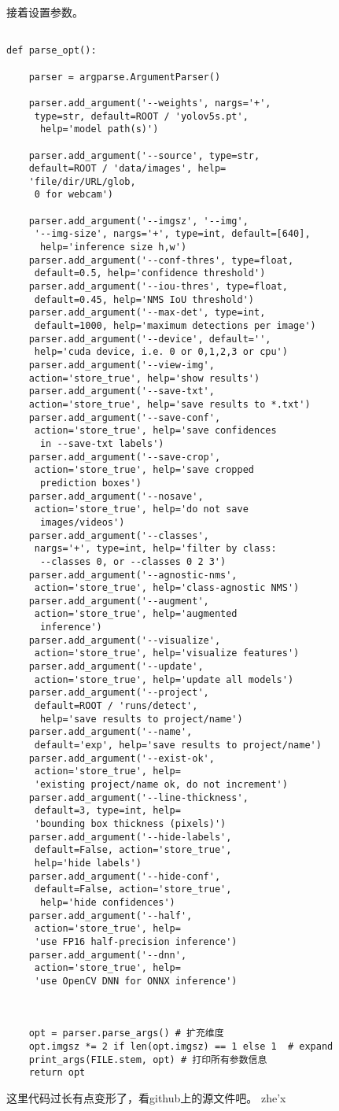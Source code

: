 接着设置参数。\begin{lstlisting}[language=none]

def parse_opt():
   
    parser = argparse.ArgumentParser()

    parser.add_argument('--weights', nargs='+',
     type=str, default=ROOT / 'yolov5s.pt',
      help='model path(s)')
 
    parser.add_argument('--source', type=str, 
    default=ROOT / 'data/images', help=
    'file/dir/URL/glob,
     0 for webcam')
  
    parser.add_argument('--imgsz', '--img',
     '--img-size', nargs='+', type=int, default=[640],
      help='inference size h,w')
    parser.add_argument('--conf-thres', type=float,
     default=0.5, help='confidence threshold')
    parser.add_argument('--iou-thres', type=float,
     default=0.45, help='NMS IoU threshold')
    parser.add_argument('--max-det', type=int,
     default=1000, help='maximum detections per image')
    parser.add_argument('--device', default='',
     help='cuda device, i.e. 0 or 0,1,2,3 or cpu')
    parser.add_argument('--view-img', 
    action='store_true', help='show results')
    parser.add_argument('--save-txt', 
    action='store_true', help='save results to *.txt')
    parser.add_argument('--save-conf',
     action='store_true', help='save confidences
      in --save-txt labels')
    parser.add_argument('--save-crop',
     action='store_true', help='save cropped
      prediction boxes')
    parser.add_argument('--nosave',
     action='store_true', help='do not save
      images/videos')
    parser.add_argument('--classes',
     nargs='+', type=int, help='filter by class:
      --classes 0, or --classes 0 2 3')
    parser.add_argument('--agnostic-nms',
     action='store_true', help='class-agnostic NMS')
    parser.add_argument('--augment',
     action='store_true', help='augmented
      inference')
    parser.add_argument('--visualize',
     action='store_true', help='visualize features')
    parser.add_argument('--update',
     action='store_true', help='update all models')
    parser.add_argument('--project',
     default=ROOT / 'runs/detect',
      help='save results to project/name')
    parser.add_argument('--name',
     default='exp', help='save results to project/name')
    parser.add_argument('--exist-ok',
     action='store_true', help=
     'existing project/name ok, do not increment')
    parser.add_argument('--line-thickness',
     default=3, type=int, help=
     'bounding box thickness (pixels)')
    parser.add_argument('--hide-labels',
     default=False, action='store_true',
     help='hide labels')
    parser.add_argument('--hide-conf',
     default=False, action='store_true',
      help='hide confidences')
    parser.add_argument('--half',
     action='store_true', help=
     'use FP16 half-precision inference')
    parser.add_argument('--dnn',
     action='store_true', help=
     'use OpenCV DNN for ONNX inference')
 
   
 
    opt = parser.parse_args() # 扩充维度
    opt.imgsz *= 2 if len(opt.imgsz) == 1 else 1  # expand
    print_args(FILE.stem, opt) # 打印所有参数信息
    return opt
\end{lstlisting}
这里代码过长有点变形了，看github上的源文件吧。
zhe'x